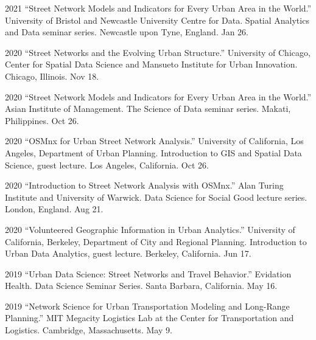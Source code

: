 \documentclass[11pt,letterpaper]{report}
\begin{document}
\begin{tablist}
        \item[2021] \tab{}\enquote{Street Network Models and Indicators for Every Urban Area in the World.} University of Bristol and Newcastle University Centre for Data. Spatial Analytics and Data seminar series. Newcastle upon Tyne, England. Jan 26.

        \item[2020] \tab{}\enquote{Street Networks and the Evolving Urban Structure.} University of Chicago, Center for Spatial Data Science and Mansueto Institute for Urban Innovation. Chicago, Illinois. Nov 18.

        \item[2020] \tab{}\enquote{Street Network Models and Indicators for Every Urban Area in the World.} Asian Institute of Management. The Science of Data seminar series. Makati, Philippines. Oct 26.

        \item[2020] \tab{}\enquote{OSMnx for Urban Street Network Analysis.} University of California, Los Angeles, Department of Urban Planning. Introduction to GIS and Spatial Data Science, guest lecture. Los Angeles, California. Oct 26.

        \item[2020] \tab{}\enquote{Introduction to Street Network Analysis with OSMnx.} Alan Turing Institute and University of Warwick. Data Science for Social Good lecture series. London, England. Aug 21.

        \item[2020] \tab{}\enquote{Volunteered Geographic Information in Urban Analytics.} University of California, Berkeley, Department of City and Regional Planning. Introduction to Urban Data Analytics, guest lecture. Berkeley, California. Jun 17.


        \item[2019] \tab{}\enquote{Urban Data Science: Street Networks and Travel Behavior.} Evidation Health. Data Science Seminar Series. Santa Barbara, California. May 16.

        \item[2019] \tab{}\enquote{Network Science for Urban Transportation Modeling and Long-Range Planning.} MIT Megacity Logistics Lab at the Center for Transportation and Logistics. Cambridge, Massachusetts. May 9.


\end{tablist}
\end{document}
